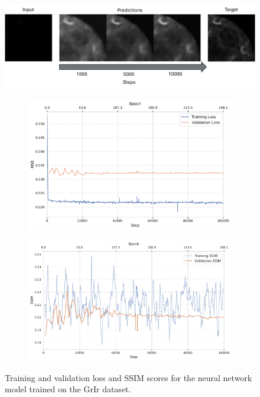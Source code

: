 \begin{figure}[h]
    \centering
    \includegraphics[width=1\linewidth]{images/training_progress_example2.pdf}
    \caption{}
    \label{fig:training-progress-example}
\end{figure}


\begin{figure}
    \centering

    \begin{subfigure}[b]{0.7\linewidth}
        \centering
        \includegraphics[width=1\linewidth]{images/loss_training_val.pdf}
        \caption{}
        \label{fig:loss-training-val}
    \end{subfigure}

    \begin{subfigure}[b]{0.7\linewidth}
        \centering
        \includegraphics[width=1\linewidth]{images/ssim_training_val.pdf}
        \caption{}
        \label{fig:ssim-training-val}
    \end{subfigure}

    \caption{Training and validation loss and \gls{SSIM} scores for the neural network model trained on the \gls{GrIr} dataset.}
    \label{fig:loss-ssim-training-val}
\end{figure}


